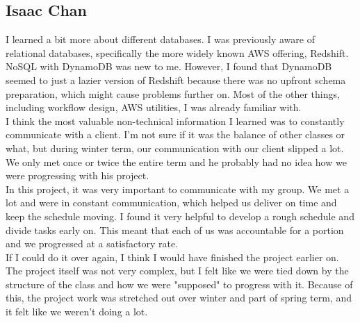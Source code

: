\subsection{Isaac Chan}
\noindent I learned a bit more about different databases. I was previously aware of relational databases, specifically the more widely known AWS offering, Redshift. NoSQL with DynamoDB was new to me. However, I found that DynamoDB seemed to just a lazier version of Redshift because there was no upfront schema preparation, which might cause problems further on. Most of the other things, including workflow design, AWS utilities, I was already familiar with. \\

\noindent I think the most valuable non-technical information I learned was to constantly communicate with a client. I'm not sure if it was the balance of other classes or what, but during winter term, our communication with our client slipped a lot. We only met once or twice the entire term and he probably had no idea how we were progressing with his project. \\

\noindent In this project, it was very important to communicate with my group. We met a lot and were in constant communication, which helped us deliver on time and keep the schedule moving. I found it very helpful to develop a rough schedule and divide tasks early on. This meant that each of us was accountable for a portion and we progressed at a satisfactory rate. \\

\noindent If I could do it over again, I think I would have finished the project earlier on. The project itself was not very complex, but I felt like we were tied down by the structure of the class and how we were "supposed" to progress with it. Because of this, the project work was stretched out over winter and part of spring term, and it felt like we weren't doing a lot. \\